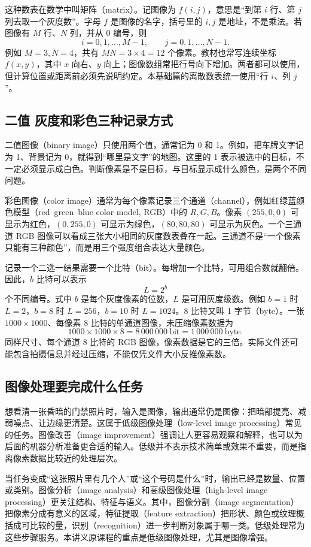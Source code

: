 这种数表在数学中叫矩阵（matrix）。记图像为 $f(i,j)$，意思是“到第 $i$ 行、第 $j$ 列去取一个灰度数”。字母 $f$ 是图像的名字，括号里的 $i,j$ 是地址，不是乘法。若图像有 $M$ 行、$N$ 列，并从 0 编号，则
\[
  i=0,1,\ldots,M-1,\qquad j=0,1,\ldots,N-1.
\]
例如 $M=3,N=4$，共有 $MN=3\times4=12$ 个像素。教材也常写连续坐标 $f(x,y)$，其中 $x$ 向右、$y$ 向上；图像数组常把行号向下增加。两者都可以使用，但计算位置或距离前必须先说明约定。本基础篇的离散数表统一使用“行 $i$、列 $j$”。

\subsection{二值 灰度和彩色三种记录方式}

二值图像（binary image）只使用两个值，通常记为 0 和 1。例如，把车牌文字记为 1、背景记为 0，就得到“哪里是文字”的地图。这里的 1 表示被选中的目标，不一定必须显示成白色。判断像素是不是目标，与目标显示成什么颜色，是两个不同问题。

彩色图像（color image）通常为每个像素记录三个通道（channel），例如红绿蓝颜色模型（red--green--blue color model, RGB）中的 $R,G,B$。像素 $(255,0,0)$ 可显示为红色，$(0,255,0)$ 可显示为绿色，$(80,80,80)$ 可显示为灰色。一个三通道 RGB 图像可以看成三张大小相同的灰度数表叠在一起。三通道不是“一个像素只能有三种颜色”，而是用三个强度组合表达大量颜色。

记录一个二选一结果需要一个比特（bit）。每增加一个比特，可用组合数就翻倍。因此，$b$ 比特可以表示
\[
  L=2^b
\]
个不同编号。式中 $b$ 是每个灰度像素的位数，$L$ 是可用灰度级数。例如 $b=1$ 时 $L=2$，$b=8$ 时 $L=256$，$b=10$ 时 $L=1024$。8 比特又叫 1 字节（byte）。一张 $1000\times1000$、每像素 8 比特的单通道图像，未压缩像素数据为
\[
  1000\times1000\times8=8\,000\,000\ \text{bit}
  =1\,000\,000\ \text{byte}.
\]
同样尺寸、每个通道 8 比特的 RGB 图像，像素数据是它的三倍。实际文件还可能包含拍摄信息并经过压缩，不能仅凭文件大小反推像素数。

\subsection{图像处理要完成什么任务}

想看清一张昏暗的门禁照片时，输入是图像，输出通常仍是图像：把暗部提亮、减弱噪点、让边缘更清楚。这属于低级图像处理（low-level image processing）常见的任务。图像改善（image improvement）强调让人更容易观察和解释，也可以为后面的机器分析准备更合适的输入。低级并不表示技术简单或效果不重要，而是指离像素数据比较近的处理层次。

当任务变成“这张照片里有几个人”或“这个号码是什么”时，输出已经是数量、位置或类别。图像分析（image analysis）和高级图像处理（high-level image processing）更关注结构、特征与语义。其中，图像分割（image segmentation）把像素分成有意义的区域，特征提取（feature extraction）把形状、颜色或纹理概括成可比较的量，识别（recognition）进一步判断对象属于哪一类。低级处理常为这些步骤服务。本讲义原课程的重点是低级图像处理，尤其是图像增强。

